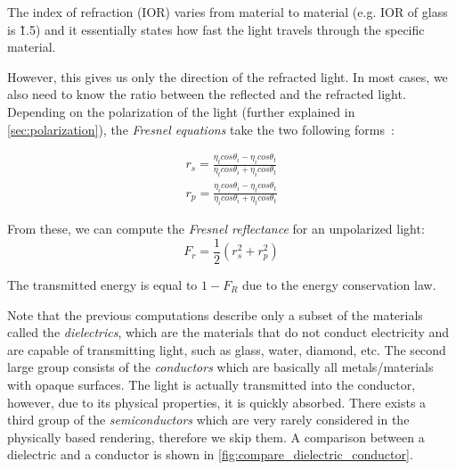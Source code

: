 The index of refraction (IOR) varies from material to material (e.g. IOR of glass is \~1.5) and it essentially states how fast the light travels through the specific material.

However, this gives us only the direction of the refracted light. In most cases, we also need to know the ratio between the reflected and the refracted light. Depending on the polarization of the light (further explained in \autoref{sec:polarization}), the \emph{Fresnel equations} take the two following forms~\cite{pharr2016physically}:

\begin{align*}
r_s = \frac{\eta_t cos\theta_i - \eta_i cos\theta_t}{\eta_t cos\theta_i + \eta_i cos\theta_t}\\
r_p = \frac{\eta_i cos\theta_i - \eta_t cos\theta_t}{\eta_i cos\theta_i + \eta_t cos\theta_t} 
\end{align*}

From these, we can compute the \emph{Fresnel reflectance} for an unpolarized light:
\begin{equation}
F_r=\frac{1}{2}(r_s^2 + r_p^2)
\end{equation}

The transmitted energy is equal to $1-F_R$ due to the energy conservation law.

Note that the previous computations describe only a subset of the materials called the \emph{dielectrics}, which are the materials that do not conduct electricity and are capable of transmitting light, such as glass, water, diamond, etc. The second large group consists of the \emph{conductors} which are basically all metals/materials with opaque surfaces. The light is actually transmitted into the conductor, however, due to its physical properties, it is quickly absorbed. There exists a third group of the \emph{semiconductors} which are very rarely considered in the physically based rendering, therefore we skip them. A comparison between a dielectric and a conductor is shown in \autoref{fig:compare_dielectric_conductor}.

